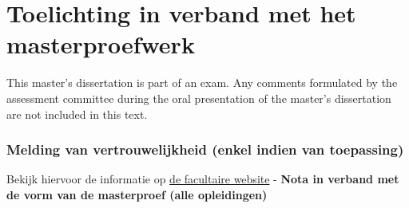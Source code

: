 \chapter*{Toelichting in verband met het masterproefwerk}

This master's dissertation is part of an exam. Any comments formulated by the assessment committee during the oral presentation of the master's dissertation are not included in this text.

\subsection*{Melding van vertrouwelijkheid (enkel indien van toepassing)}

Bekijk hiervoor de informatie op \href{https://www.ugent.be/ea/nl/faculteit/studentenadministratie/masterproef/} {de facultaire website} - \textbf{Nota in verband met de vorm van de masterproef (alle opleidingen)}